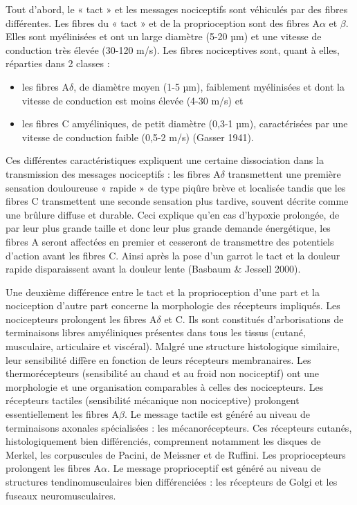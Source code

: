 \documentclass[a4paper,12pt,twoside]{report}
\begin{document}
\medskip 
 
Tout d’abord, le « tact » et les messages nociceptifs sont véhiculés par des fibres différentes. Les fibres du « tact » et de la proprioception sont des fibres A$\alpha$ et $\beta$. Elles sont myélinisées et ont un large diamètre (5-20 µm) et une vitesse de conduction très élevée (30-120 m/s). Les fibres nociceptives sont, quant à elles, réparties dans 2 classes : 

\begin{itemize}
\item les fibres A$\delta$, de diamètre moyen (1-5 µm), faiblement myélinisées et dont la vitesse de conduction est moins élevée (4-30 m/s) et 
\item les fibres C amyéliniques, de petit diamètre (0,3-1 µm), caractérisées par une vitesse de conduction faible (0,5-2 m/s) (Gasser 1941). 
\end{itemize}

Ces différentes caractéristiques expliquent une certaine dissociation dans la transmission des messages nociceptifs : les fibres A$\delta$ transmettent une première sensation douloureuse « rapide » de type piqûre brève et localisée tandis que les fibres C transmettent une seconde sensation plus tardive, souvent décrite comme une brûlure diffuse et durable. Ceci explique qu’en cas d’hypoxie prolongée, de par leur plus grande taille et donc leur plus grande demande énergétique, les fibres A seront affectées en premier et cesseront de transmettre des potentiels d’action avant les fibres C. Ainsi après la pose d’un garrot le tact et la douleur rapide disparaissent avant la douleur lente (Basbaum \& Jessell 2000).

\medskip 

Une deuxième différence entre le tact et la proprioception d’une part et la nociception d’autre part concerne la morphologie des récepteurs impliqués. Les nocicepteurs prolongent les fibres A$\delta$ et C. Ils sont constitués d’arborisations de terminaisons libres amyéliniques présentes dans tous les tissus (cutané, musculaire, articulaire et viscéral). Malgré une structure histologique similaire, leur sensibilité diffère en fonction de leurs récepteurs membranaires. Les thermorécepteurs (sensibilité au chaud et au froid non nociceptif) ont une morphologie et une organisation comparables à celles des nocicepteurs. Les récepteurs tactiles (sensibilité mécanique non nociceptive) prolongent essentiellement les fibres A$\beta$. Le message tactile est généré au niveau de terminaisons axonales spécialisées : les mécanorécepteurs. Ces récepteurs cutanés, histologiquement bien différenciés, comprennent notamment les disques de Merkel, les corpuscules de Pacini, de Meissner et de Ruffini. Les propriocepteurs prolongent les fibres A$\alpha$. Le message proprioceptif est généré au niveau de structures tendinomusculaires bien différenciées : les récepteurs de Golgi et les fuseaux neuromusculaires. 
\end{document}
